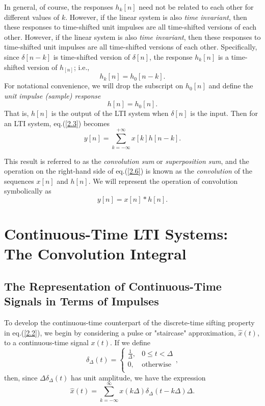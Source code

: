 \documentclass[a4paper,10pt,twoside]{book}
\begin{document}
In general, of course, the responses $h_k[n]$ need not be related to each other for different values of $k$. However, if the linear system is also \textit{time invariant}, then these responses to time-shifted unit impulses are all time-shifted versions of each other. However, if the linear system is also \textit{time invariant}, then these responses to time-shifted unit impulses are all time-shifted versions of each other. Specifically, since $\delta[n-k]$ is time-shifted version of $\delta[n]$, the response $h_k[n]$ is a time-shifted version of $h_[n]$; i.e.,
\begin{equation}
    h_k[n]=h_0[n-k].
    \label{2.4}
\end{equation}
For notational convenience, we will drop the subscript on $h_0[n]$ and define the \textit{unit impulse (sample) response}
\begin{equation}
    h[n]=h_0[n].
    \label{2.5}
\end{equation}
That is, $h[n]$ is the output of the LTI system when $\delta[n]$ is the input. Then for an LTI system, eq.\;(\ref{2.3}) becomes
\begin{equation}
    \boxed{y[n] = \sum_{k = -\infty}^{+\infty}x[k]h[n-k].}
    \label{2.6}
\end{equation}

This result is referred to as the \textit{convolution sum} or \textit{superposition sum}, and the operation on the right-hand side of eq.\;(\ref{2.6}) is known as the \textit{convolution} of the sequences $x[n]$ and $h[n]$. We will represent the operation of convolution symbolically as
\begin{equation}
    y[n]=x[n]*h[n].
    \label{2.7}
\end{equation}

\section{Continuous-Time LTI Systems: The Convolution Integral}
\subsection{The Representation of Continuous-Time Signals in Terms of Impulses}

To develop the continuous-time counterpart of the discrete-time sifting property in eq.\;(\ref{2.2}), we begin by considering a pulse or "staircase" approximation, $\hat{x}(t)$, to a continuous-time signal $x(t)$. If we define
\begin{equation}
    \left.\delta_{\Delta}(t) = \left\{\begin{array}{ll}{\frac{1}{\Delta},}&{0\leq t<\Delta}\\{0,}&{\mathrm{otherwise}}\\\end{array}\right.,\right.
    \label{2.24}
\end{equation}
then, since $\Delta\delta_\Delta(t)$ has unit amplitude, we have the expression
\begin{equation}
    \hat{x}(t) = \sum_{k = -\infty}^{\infty}x(k\Delta)\delta_{\Delta}(t - k\Delta)\Delta.
    \label{2.25}
\end{equation}
\end{document}
